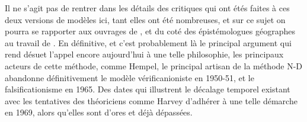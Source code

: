 Il ne s'agit pas de rentrer dans les détails des critiques qui ont étés faites à ces deux versions de modèles ici, tant elles ont été nombreuses, et sur ce sujet on pourra se rapporter aux ouvrages de \textcite{Chalmers1987}, \textcite[214-215]{Meyer1979} et du coté des épistémologues géographes au travail de \autocite{Besse2000}. En définitive, et c'est probablement là le principal argument qui rend désuet l'appel encore aujourd'hui à une telle philosophie, les principaux acteurs de cette méthode, comme Hempel, le principal artisan de la méthode N-D abandonne définitivement le modèle vérificanioniste en 1950-51, et le falsificationisme en 1965. Des dates qui illustrent le décalage temporel existant avec les tentatives des théoriciens comme Harvey d'adhérer à une telle démarche en 1969, alors qu'elles sont d'ores et déjà dépassées.




